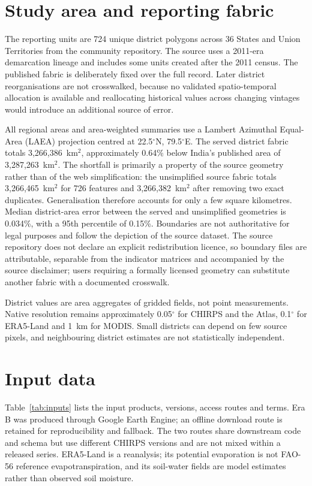 \documentclass[10pt,a4paper]{article}
\begin{document}
\section*{Study area and reporting fabric}
The reporting units are 724 unique district polygons across 36 States and Union Territories from the community  repository\citep{uditIndiaMaps}. The source uses a 2011-era demarcation lineage and includes some units created after the 2011 census. The published fabric is deliberately fixed over the full record. Later district reorganisations are not crosswalked, because no validated spatio-temporal allocation is available and reallocating historical values across changing vintages would introduce an additional source of error.

All regional areas and area-weighted summaries use a Lambert Azimuthal Equal-Area (LAEA) projection centred at 22.5$^\circ$N, 79.5$^\circ$E. The served district fabric totals 3,266,386~km$^2$, approximately 0.64\% below India's published area of 3,287,263~km$^2$. The shortfall is primarily a property of the source geometry rather than of the web simplification: the unsimplified source fabric totals 3,266,465~km$^2$ for 726 features and 3,266,382~km$^2$ after removing two exact duplicates. Generalisation therefore accounts for only a few square kilometres. Median district-area error between the served and unsimplified geometries is 0.034\%, with a 95th percentile of 0.15\%. Boundaries are not authoritative for legal purposes and follow the depiction of the source dataset. The source repository does not declare an explicit redistribution licence, so boundary files are attributable, separable from the indicator matrices and accompanied by the source disclaimer; users requiring a formally licensed geometry can substitute another fabric with a documented crosswalk.

District values are area aggregates of gridded fields, not point measurements. Native resolution remains approximately 0.05$^\circ$ for CHIRPS and the Atlas, 0.1$^\circ$ for ERA5-Land and 1~km for MODIS. Small districts can depend on few source pixels, and neighbouring district estimates are not statistically independent.

\section*{Input data}
Table~\ref{tab:inputs} lists the input products, versions, access routes and terms. Era B was produced through Google Earth Engine\citep{Gorelick2017}; an offline download route is retained for reproducibility and fallback. The two routes share downstream code and schema but use different CHIRPS versions and are not mixed within a released series. ERA5-Land is a reanalysis\citep{Hersbach2020}; its potential evaporation is not FAO-56 reference evapotranspiration, and its soil-water fields are model estimates rather than observed soil moisture.
\end{document}
